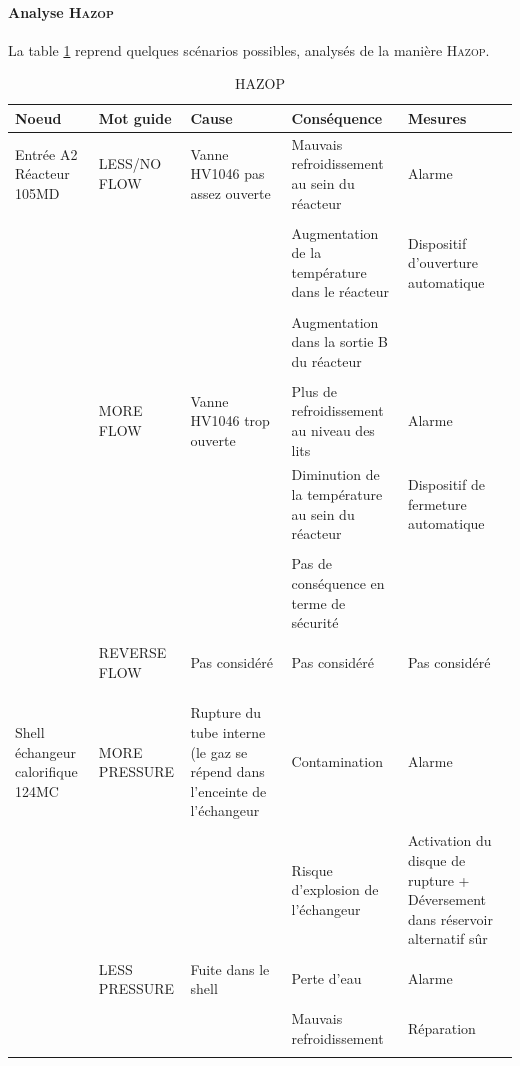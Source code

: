 \paragraph{Analyse \textsc{Hazop}} La table \ref{Hazop} reprend quelques scénarios possibles, analysés de la 
manière \textsc{Hazop}.
\begin{landscape}
\begin{table}
\centering
\begin{tabular}{|p{2cm}|p{3cm}|p{4cm}|p{6cm}|p{5cm}|}
\hline
Noeud & Mot guide & Cause & Conséquence & Mesures \\
\hline
\hline
Entrée A2 Réacteur 105MD & LESS/NO FLOW & Vanne HV1046 pas assez ouverte & Mauvais refroidissement au sein du
réacteur & Alarme \\
& & & & \\
& & & Augmentation de la température dans le réacteur & Dispositif d'ouverture automatique \\
& & & & \\
& & & Augmentation dans la sortie B du réacteur & \\
& & & & \\
& MORE FLOW & Vanne HV1046 trop ouverte & Plus de refroidissement au niveau des lits & Alarme \\
& & & Diminution de la température au sein du réacteur & Dispositif de fermeture automatique \\
& & & & \\
& & & Pas de conséquence en terme de sécurité & \\
& & & & \\
& REVERSE FLOW & Pas considéré & Pas considéré & Pas considéré \\
& & & & \\
& & & & \\
& & & & \\
Shell échangeur calorifique 124MC & MORE PRESSURE & Rupture du tube interne (le gaz se répend dans l'enceinte de
l'échangeur & Contamination & Alarme \\
& & & & \\
& & & Risque d'explosion de l'échangeur & Activation du disque de rupture + Déversement dans réservoir alternatif sûr \\
& & & & \\
& LESS PRESSURE & Fuite dans le shell & Perte d'eau & Alarme \\
& & & & \\
& & & Mauvais refroidissement & Réparation \\
& & & & \\
\hline
\end{tabular}
\caption{HAZOP}
\label{Hazop}
\end{table}
\end{landscape}

